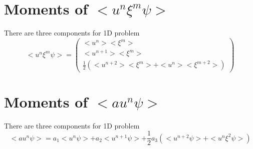 \documentclass[a4paper]{book}
\begin{document}
\begin{appendices}
    \section*{Moments of $<u^n\xi^m\psi>$}
    There are three components for 1D problem
    $$
    <u^n\xi^m\psi>=\begin{pmatrix}
        <u^n><\xi^m>\\
        <u^{n+1}><\xi^m>\\
        \frac{1}{2}\left(<u^{n+2}><\xi^m>+<u^n><\xi^{m+2}>\right)
    \end{pmatrix} 
    $$

    \section*{Moments of $<au^n\psi>$}
    There are three components for 1D problem
    $$<au^n\psi>=a_1<u^n\psi>+a_2<u^{n+1}\psi>+\frac{1}{2}a_3\left(<u^{n+2}\psi>+<u^n\xi^2\psi>\right)$$
\end{appendices}

\cleardoublepage
{}
{}


\end{document}
